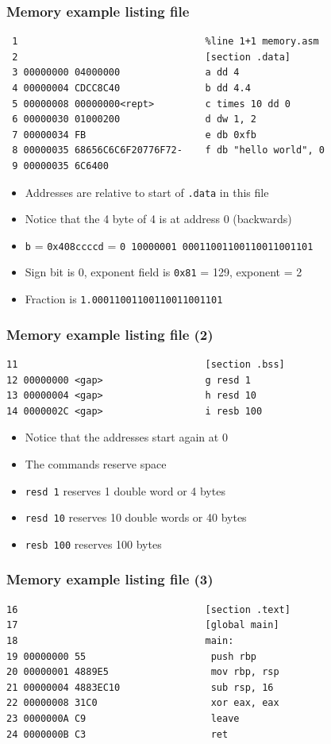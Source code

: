 \documentclass{beamer}
\begin{document}
\begin{frame}[fragile]
    \frametitle{Memory example listing file}
\begin{verbatim}
 1                                 %line 1+1 memory.asm
 2                                 [section .data]
 3 00000000 04000000               a dd 4
 4 00000004 CDCC8C40               b dd 4.4
 5 00000008 00000000<rept>         c times 10 dd 0
 6 00000030 01000200               d dw 1, 2
 7 00000034 FB                     e db 0xfb
 8 00000035 68656C6C6F20776F72-    f db "hello world", 0
 9 00000035 6C6400             
\end{verbatim}
    \begin{itemize}
        \item Addresses are relative to start of {\tt .data} in this file
        \item Notice that the 4 byte of 4 is at address 0 (backwards)
        \item {\tt b} = {\tt 0x408ccccd} = {\tt 0 10000001 00011001100110011001101}
        \item Sign bit is 0, exponent field is {\tt 0x81} = 129, exponent = 2
        \item Fraction is {\tt 1.00011001100110011001101}
    \end{itemize}
\end{frame}

\begin{frame}[fragile]
    \frametitle{Memory example listing file (2)}
\begin{verbatim}
11                                 [section .bss]
12 00000000 <gap>                  g resd 1
13 00000004 <gap>                  h resd 10
14 0000002C <gap>                  i resb 100
\end{verbatim}
    \begin{itemize}
        \item Notice that the addresses start again at 0
        \item The commands reserve space
        \item {\tt resd 1} reserves 1 double word or 4 bytes
        \item {\tt resd 10} reserves 10 double words or 40 bytes
        \item {\tt resb 100} reserves 100 bytes
    \end{itemize}
\end{frame}

\begin{frame}[fragile]
    \frametitle{Memory example listing file (3)}
\begin{verbatim}
16                                 [section .text]
17                                 [global main]
18                                 main:
19 00000000 55                      push rbp
20 00000001 4889E5                  mov rbp, rsp
21 00000004 4883EC10                sub rsp, 16
22 00000008 31C0                    xor eax, eax
23 0000000A C9                      leave
24 0000000B C3                      ret
\end{verbatim}
\end{frame}
\end{document}

